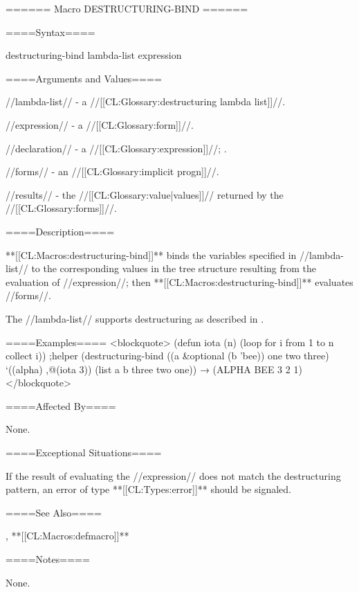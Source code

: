 ====== Macro DESTRUCTURING-BIND ======


====Syntax====

\DefmacWithValuesNewline destructuring-bind {lambda-list expression  } {}

====Arguments and Values====


//lambda-list// - a //[[CL:Glossary:destructuring lambda list]]//.

//expression// - a //[[CL:Glossary:form]]//.

//declaration// - a  //[[CL:Glossary:expression]]//; \noeval.

//forms// - an //[[CL:Glossary:implicit progn]]//.

//results// - the //[[CL:Glossary:value|values]]// returned by the //[[CL:Glossary:forms]]//.

====Description====

**[[CL:Macros:destructuring-bind]]** binds the variables specified in //lambda-list// to the corresponding values in the tree structure resulting from the evaluation of //expression//; then **[[CL:Macros:destructuring-bind]]** evaluates //forms//.


The //lambda-list// supports destructuring as described in \secref\DestructuringLambdaLists.

====Examples==== <blockquote> (defun iota (n) (loop for i from 1 to n collect i)) ;helper (destructuring-bind ((a &optional (b 'bee)) one two three) `((alpha) ,@(iota 3)) (list a b three two one)) → (ALPHA BEE 3 2 1) </blockquote>


====Affected By====

None.

====Exceptional Situations====

If the result of evaluating the //expression// does not match the destructuring pattern, an error of type **[[CL:Types:error]]** should be signaled.

====See Also====

, **[[CL:Macros:defmacro]]**

====Notes====

None.


 
